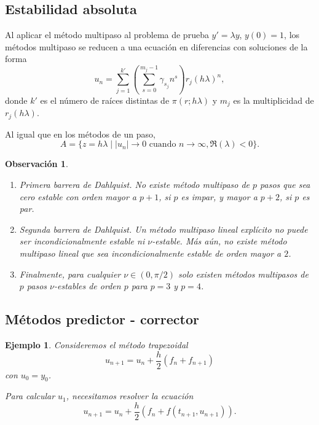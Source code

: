 \documentclass[11pt,letterpaper]{report}
\newtheorem{example}{Ejemplo}
\newtheorem{remark}{Observación}
\begin{document}
\subsection{Estabilidad absoluta}
Al aplicar el método multipaso al problema de prueba $y'=\lambda y$,
$y(0)=1$, los métodos multipaso se reducen a una ecuación en
diferencias con soluciones de la forma
\begin{equation}
  u_n = \sum_{j=1}^{k'}
  \left(
    \sum_{s=0}^{m_j-1} \gamma_{s_j} n^{s}
  \right)
  r_{j}(h\lambda)^n
,\end{equation}
donde $k'$ es el número de raíces distintas de $\pi(r;h\lambda)$ y
$m_j$ es la multiplicidad de $r_j(h\lambda)$.

Al igual que en los métodos de un paso,
\begin{equation}
  A 
  = \{
    z=h\lambda
  \mid
  |u_n|\to 0 \text{ cuando } n\to \infty,
  \Re(\lambda)<0
\}
.\end{equation}

\begin{remark}
  \begin{enumerate}
    \item
      Primera barrera de Dahlquist.
      No existe método multipaso de $p$ pasos que sea cero estable con
      orden mayor a $p+1$, si $p$ es impar, y mayor a $p+2$, si $p$ es
      par.
    \item
      Segunda barrera de Dahlquist. Un método multipaso lineal
      explícito no puede ser incondicionalmente estable ni
      $\nu$-estable. Más aún, no existe método multipaso lineal que
      sea incondicionalmente estable de orden mayor a $2$.
    \item
      Finalmente, para cualquier $\nu\in(0,\pi / 2)$ solo existen
      métodos multipasos de $p$ pasos $\nu$-estables de orden $p$ para
      $p=3$ y $p=4$.
  \end{enumerate}
\end{remark}

\subsection{Métodos predictor - corrector}

\begin{example}
  Consideremos el método trapezoidal
  \begin{equation}
    u_{n+1} = u_n + \frac{h}{2}(f_n + f_{n+1})
  \end{equation}
  con $u_0=y_0$.

  Para calcular $u_1$, necesitamos resolver la ecuación
  \begin{equation}
    u_{n+1} = u_n + \frac{h}{2}(f_n + f(t_{n+1},u_{n+1})).
  \end{equation}
\end{example}
\end{document}
